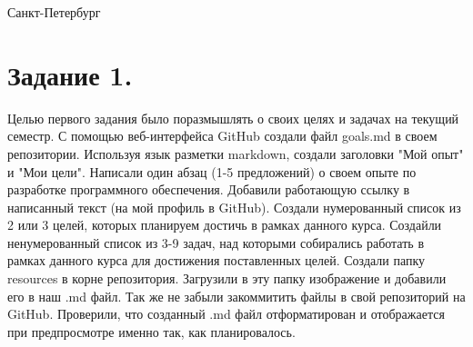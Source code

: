 \documentclass[12pt]{article}
\begin{document}
 

 
  \vspace{\baselineskip}
 \vspace{\baselineskip}
 \vspace{\baselineskip}
 \vspace{\baselineskip}
 \vspace{\baselineskip}
\vspace{\baselineskip}
 \vspace{\baselineskip}
\vspace{\baselineskip}
\vspace{\baselineskip}
\vspace{\baselineskip} \vspace{\baselineskip}
\vspace{\baselineskip}
\vspace{\baselineskip}


 \begin{Center}
 Санкт-Петербург 
 \par \the\year{}
 \end{Center}\par


\newpage

\setcounter{page}{2}
\tableofcontents

\newpage



\section*{Задание 1.}

Целью первого задания было поразмышлять о своих целях и задачах на текущий семестр.
С помощью веб-интерфейса GitHub создали файл goals.md в своем репозитории.
Используя язык разметки markdown, создали заголовки "Мой опыт" и "Мои цели".
Написали один абзац (1-5 предложений) о своем опыте по разработке программного обеспечения. Добавили работающую ссылку в написанный текст (на мой профиль в GitHub).
Создали нумерованный список из 2 или 3 целей, которых планируем достичь в рамках данного курса.
Создайли ненумерованный список из 3-9 задач, над которыми собирались работать в рамках данного курса для достижения поставленных целей.
Создали папку resources в корне репозитория. Загрузили в эту папку изображение и добавили его в наш .md файл.
Так же не забыли закоммитить файлы в свой репозиторий на GitHub.
Проверили, что созданный .md файл отформатирован и отображается при предпросмотре именно так, как планировалось.
\end{document}
